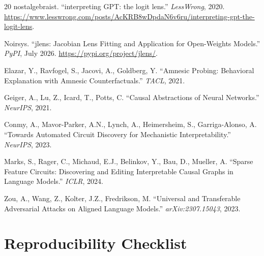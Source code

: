 \documentclass[11pt]{article}
\begin{document}
\begin{thebibliography}{20}
nostalgebraist. ``interpreting GPT: the logit lens.'' \emph{LessWrong}, 2020. \url{https://www.lesswrong.com/posts/AcKRB8wDpdaN6v6ru/interpreting-gpt-the-logit-lens}.

Noirsys. ``jlens: Jacobian Lens Fitting and Application for Open-Weights Models.'' \emph{PyPI}, July 2026. \url{https://pypi.org/project/jlens/}.

Elazar, Y., Ravfogel, S., Jacovi, A., Goldberg, Y. ``Amnesic Probing: Behavioral Explanation with Amnesic Counterfactuals.'' \emph{TACL}, 2021.

Geiger, A., Lu, Z., Icard, T., Potts, C. ``Causal Abstractions of Neural Networks.'' \emph{NeurIPS}, 2021.

Conmy, A., Mavor-Parker, A.N., Lynch, A., Heimersheim, S., Garriga-Alonso, A. ``Towards Automated Circuit Discovery for Mechanistic Interpretability.'' \emph{NeurIPS}, 2023.

Marks, S., Rager, C., Michaud, E.J., Belinkov, Y., Bau, D., Mueller, A. ``Sparse Feature Circuits: Discovering and Editing Interpretable Causal Graphs in Language Models.'' \emph{ICLR}, 2024.

Zou, A., Wang, Z., Kolter, J.Z., Fredrikson, M. ``Universal and Transferable Adversarial Attacks on Aligned Language Models.'' \emph{arXiv:2307.15043}, 2023.

\end{thebibliography}

\appendix
\section{Reproducibility Checklist}
\end{document}
